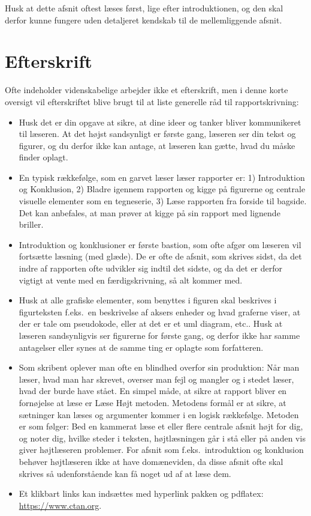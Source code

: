 \documentclass[a4paper]{article}
\begin{document}
Husk at dette afsnit oftest læses først, lige efter introduktionen, og den skal derfor kunne fungere uden detaljeret kendskab til de mellemliggende afsnit.

\section{Efterskrift}
Ofte indeholder videnskabelige arbejder ikke et efterskrift, men i denne korte oversigt vil efterskriftet blive brugt til at liste generelle råd til rapportskrivning:
\begin{itemize}
\item Husk det er din opgave at sikre, at dine ideer og tanker bliver kommunikeret til læseren. At det højst sandsynligt er første gang, læseren ser din tekst og figurer, og du derfor ikke kan antage, at læseren kan gætte, hvad du måske finder oplagt.
\item En typisk rækkefølge, som en garvet læser læser rapporter er: 1) Introduktion og Konklusion, 2) Bladre igennem rapporten og kigge på figurerne og centrale visuelle elementer som en tegneserie, 3) Læse rapporten fra forside til bagside. Det kan anbefales, at man prøver at kigge på sin rapport med lignende briller.
\item Introduktion og konklusioner er første bastion, som ofte afgør om læseren vil fortsætte læsning (med glæde). De er ofte de afsnit, som skrives sidst, da det indre af rapporten ofte udvikler sig indtil det sidste, og da det er derfor vigtigt at vente med en færdigskrivning, så alt kommer med.
\item Husk at alle grafiske elementer, som benyttes i figuren skal beskrives i figurteksten f.eks.\ en beskrivelse af aksers enheder og hvad graferne viser, at der er tale om pseudokode, eller at det er et uml diagram, etc.. Husk at læseren sandsynligvis ser figurerne for første gang, og derfor ikke har samme antagelser eller synes at de samme ting er oplagte som forfatteren.
\item Som skribent oplever man ofte en blindhed overfor sin produktion: Når man læser, hvad man har skrevet, overser man fejl og mangler og i stedet læser, hvad der burde have stået. En simpel måde, at sikre at rapport bliver en fornøjelse at læse er Læse Højt metoden. Metodens formål er at sikre, at sætninger kan læses og argumenter kommer i en logisk rækkefølge.  Metoden er som følger: Bed en kammerat læse et eller flere centrale afsnit højt for dig, og noter dig, hvilke steder i teksten, højtlæsningen går i stå eller på anden vis giver højtlæseren problemer. For afsnit som f.eks.\ introduktion og konklusion behøver højtlæseren ikke at have domæneviden, da disse afsnit ofte skal skrives så udenforstående kan få noget ud af at læse dem.
\item Et klikbart links kan indsættes med hyperlink pakken og pdflatex: \url{https://www.ctan.org}.
\end{itemize}
\end{document}
